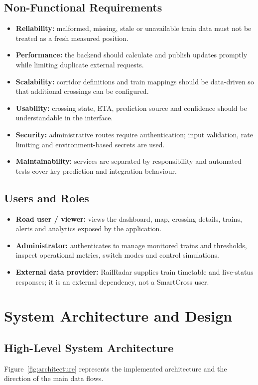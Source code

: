 \documentclass[11pt,a4paper]{report}
\begin{document}
\section{Non-Functional Requirements}
\begin{itemize}
  \item \textbf{Reliability:} malformed, missing, stale or unavailable train data must not be treated as a fresh measured position.
  \item \textbf{Performance:} the backend should calculate and publish updates promptly while limiting duplicate external requests.
  \item \textbf{Scalability:} corridor definitions and train mappings should be data-driven so that additional crossings can be configured.
  \item \textbf{Usability:} crossing state, ETA, prediction source and confidence should be understandable in the interface.
  \item \textbf{Security:} administrative routes require authentication; input validation, rate limiting and environment-based secrets are used.
  \item \textbf{Maintainability:} services are separated by responsibility and automated tests cover key prediction and integration behaviour.
\end{itemize}

\section{Users and Roles}
\begin{itemize}
  \item \textbf{Road user / viewer:} views the dashboard, map, crossing details, trains, alerts and analytics exposed by the application.
  \item \textbf{Administrator:} authenticates to manage monitored trains and thresholds, inspect operational metrics, switch modes and control simulations.
  \item \textbf{External data provider:} RailRadar supplies train timetable and live-status responses; it is an external dependency, not a SmartCross user.
\end{itemize}

\chapter{System Architecture and Design}
\section{High-Level System Architecture}
Figure~\ref{fig:architecture} represents the implemented architecture and the direction of the main data flows.
\end{document}
